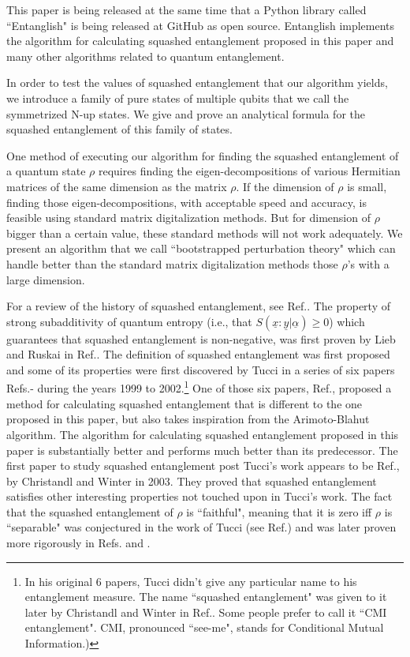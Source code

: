 \documentclass[12pt]{article}%
\newcommand{\ul}[1]{\underline{#1}}
\newcommand{\rvx}[0]{{\ul{x}}}
\newcommand{\rvy}[0]{{\ul{y}}}
\newcommand{\rvalp}[0]{{\ul{\alpha}}}
\begin{document}
This paper is being released at the same time that
a Python library called ``Entanglish"
is being released at GitHub as open source.
Entanglish implements the algorithm for
calculating squashed entanglement proposed
in this paper and many other algorithms related
to quantum entanglement.

In order to test
the values of squashed
entanglement that our algorithm
yields, we introduce
a family of pure states of multiple qubits
that we call the symmetrized N-up states.
We give and prove an analytical formula
for the squashed entanglement of this
family of states.

One method of executing our algorithm for finding the
squashed entanglement of a quantum state $\rho$ requires
finding the eigen-decompositions of
various Hermitian matrices
of the same dimension
as the matrix $\rho$.
If the dimension of $\rho$
is small, finding
those eigen-decompositions,
with acceptable
speed and accuracy,
is feasible
using standard matrix
digitalization methods.
But
for dimension of $\rho$
bigger than a certain
value, these standard methods
will not work adequately.
We present an algorithm
that we call ``bootstrapped perturbation
theory" which
can handle better
than the standard
matrix digitalization methods
those $\rho$'s
with a large dimension.

For a review of the history of squashed
entanglement, see Ref.\cite{sq-wiki}.
The property
of strong subadditivity
of quantum entropy (i.e., that
$S(\rvx:\rvy|\rvalp)\geq 0$)
which guarantees that
squashed entanglement is non-negative, was first proven by Lieb and Ruskai in Ref.\cite{subadd-proof}.
The definition of squashed entanglement was first
proposed
and some of its properties
were first discovered by Tucci in a series of six papers
Refs.\cite{Tuc99}-\cite{Tuc02}
during the years 1999 to 2002.\footnote{
In his original 6 papers, Tucci didn't give any particular name to
his entanglement measure. The
name ``squashed  entanglement" was given
to it later by Christandl and Winter in Ref.\cite{Chr03}.
Some people prefer to call it ``CMI entanglement". CMI, 
pronounced ``see-me", stands for Conditional Mutual Information.)}
One of those six papers, Ref.\cite{Tuc01a},
proposed a method
for calculating squashed
entanglement that is different to the one
proposed in this paper, but also takes inspiration
from the Arimoto-Blahut algorithm.
The algorithm for calculating squashed
entanglement proposed in this paper
is substantially better and performs much better than its
predecessor.
The first paper to study
squashed entanglement
post Tucci's work appears to be
Ref.\cite{Chr03}, by Christandl and Winter in 2003.
They proved that squashed entanglement
satisfies other interesting properties
not touched upon in Tucci's work.
The fact that the squashed entanglement
of $\rho$ is
``faithful", meaning that it
is zero iff $\rho$ is ``separable"
was conjectured in the work of Tucci
(see  Ref.\cite{Tuc00a}) and was later proven
more rigorously in Refs.\cite{sep-proof1} and \cite{sep-proof2}.
\end{document}
